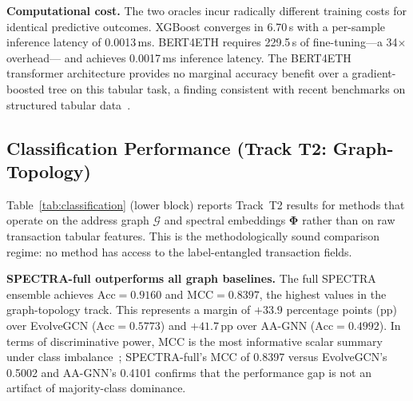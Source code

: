 \textbf{Computational cost.}
The two oracles incur radically different training costs for identical
predictive outcomes.
XGBoost converges in \num{6.70}\,s with a per-sample inference latency
of \num{0.0013}\,ms.
BERT4ETH requires \num{229.5}\,s of fine-tuning---a \num{34}$\times$ overhead---
and achieves \num{0.0017}\,ms inference latency.
The BERT4ETH transformer architecture provides no marginal accuracy benefit
over a gradient-boosted tree on this tabular task, a finding consistent with
recent benchmarks on structured tabular data~\cite{Grinsztajn2022}.


\subsection{Classification Performance (Track T2: Graph-Topology)}
\label{subsec:t2_results}

Table~\ref{tab:classification} (lower block) reports Track~T2 results for
methods that operate on the address graph $\mathcal{G}$ and spectral
embeddings $\boldsymbol{\Phi}$ rather than on raw transaction tabular features.
This is the methodologically sound comparison regime: no method has access
to the label-entangled transaction fields.

\textbf{SPECTRA-full outperforms all graph baselines.}
The full SPECTRA ensemble achieves $\text{Acc} = \num{0.9160}$ and
$\text{MCC} = \num{0.8397}$, the highest values in the graph-topology track.
This represents a margin of $+\num{33.9}$ percentage points (pp) over
EvolveGCN ($\text{Acc} = \num{0.5773}$) and $+\num{41.7}$\,pp over
AA-GNN ($\text{Acc} = \num{0.4992}$).
In terms of discriminative power, MCC is the most informative scalar
summary under class imbalance~\cite{Chicco2020}; SPECTRA-full's MCC of
\num{0.8397} versus EvolveGCN's \num{0.5002} and AA-GNN's \num{0.4101}
confirms that the performance gap is not an artifact of majority-class
dominance.

